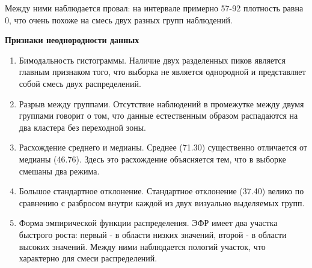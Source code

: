 \documentclass[11pt]{article}
\begin{document}
Между ними наблюдается провал: на интервале примерно 57-92 плотность
равна 0, что очень похоже на смесь двух разных групп наблюдений.

\textbf{Признаки неоднородности данных}

\begin{enumerate}
\def\labelenumi{\arabic{enumi}.}
\item
  Бимодальность гистограммы. Наличие двух разделенных пиков является
  главным признаком того, что выборка не является однородной и
  представляет собой смесь двух распределений.
\item
  Разрыв между группами. Отсутствие наблюдений в промежутке между двумя
  группами говорит о том, что данные естественным образом распадаются на
  два кластера без переходной зоны.
\item
  Расхождение среднего и медианы. Среднее (71.30) существенно отличается
  от медианы (46.76). Здесь это расхождение объясняется тем, что в
  выборке смешаны два режима.
\item
  Большое стандартное отклонение. Стандартное отклонение (37.40) велико
  по сравнению с разбросом внутри каждой из двух визуально выделяемых
  групп.
\item
  Форма эмпирической функции распределения. ЭФР имеет два участка
  быстрого роста: первый - в области низких значений, второй - в области
  высоких значений. Между ними наблюдается пологий участок, что
  характерно для смеси распределений.
\end{enumerate}
\end{document}
